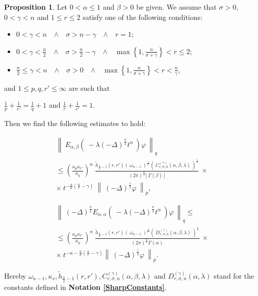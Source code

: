 \documentclass{amsart}
\theoremstyle{definition}
\newtheorem{proposition}[theorem]{Proposition}
\theoremstyle{remark}
\numberwithin{equation}{section}
\begin{document}
\begin{proposition}\label{SobolevYoungProposition}
	Let $0<\alpha\leq 1$ and $\beta>0$ be given.
	We assume that $\sigma>0$, $0<\gamma<n$ and $1\leq r\leq 2$ satisfy one of the following conditions:
	\begin{itemize}
		\item[{\bf (i)}] $0<\gamma< n$~~$\wedge$~~$\sigma>n-\gamma$~~$\wedge$~~$r=1$;
		\item[{\bf (ii)}] $\displaystyle 0<\gamma< \frac{n}{2}$~~$\wedge$~~$\displaystyle \sigma>\frac{n}{2}-\gamma$~~$\wedge$~~$\displaystyle \max\left\{1,\frac{n}{\sigma+\gamma}\right\} <r\leq 2$; 
		\item[{\bf (iii)}] $\displaystyle \frac{n}{2}\leq \gamma< n$~~$\wedge$~~$\sigma>0$~~$\wedge$~~$\displaystyle \max\left\{1,\frac{n}{\sigma+\gamma}\right\} <r<\frac{n}{\gamma}$, 
	\end{itemize}
	and $1\leq p,q,r'\leq \infty$ are such that
	\begin{center}
		$\displaystyle \frac{1}{p}+\frac{1}{r'}=\frac{1}{q}+1$ and $\displaystyle \frac{1}{r}+\frac{1}{r'}=1$.
	\end{center}
	Then we find the following estimates to hold: 
	
	\begin{eqnarray}
		\label{NoSobolevYoungIneqHankel}
		\displaystyle \left\|~ E_{\alpha,\beta}\left(~-\lambda (-\Delta)^{\frac{\sigma}{2}} t^{\alpha}~\right)\varphi~\right\|_q\nonumber \\ \leq \left(\frac{\kappa_p\kappa_{r'}}{\kappa_q}\right)^n~\frac{\widetilde{h}_{\frac{n}{2}-1}(r,r')\left(~\omega_{n-1}~\right)^{\frac{1}{r'}}\left(~C_{r,\sigma,n}^{(\gamma)}(\alpha,\beta,\lambda)~\right)^{\frac{1}{r}}}{(2\pi)^{\frac{n}{2}}\left|~\Gamma(\beta)~\right|}~\times \nonumber  \\ \times ~t^{-\frac{\alpha}{\sigma}\left(\frac{n}{r}-\gamma\right)}~
		\left\|~(-\Delta)^{\frac{\gamma}{2}}\varphi~\right\|_p, \\ \nonumber \\ \nonumber \\
		\displaystyle \left\|~ (-\Delta)^{\frac{\sigma}{2}}E_{\alpha,\alpha}\left(~-\lambda (-\Delta)^{\frac{\sigma}{2}} t^{\alpha}~\right)\varphi~\right\|_q\leq \nonumber \\
		\label{NoSobolevYoungIneqHankel2} \leq \left(\frac{\kappa_p\kappa_{r'}}{\kappa_q}\right)^n~\frac{\widetilde{h}_{\frac{n}{2}-1}(r,r')\left(~\omega_{n-1}~\right)^{\frac{1}{r'}}\left(~D_{r,\sigma,n}^{(\gamma)}(\alpha,\beta,\lambda)~\right)^{\frac{1}{r}}}{(2\pi)^{\frac{n}{2}}\Gamma(\alpha)}~\times \nonumber \\ \times~ t^{-\alpha-\frac{\alpha}{\sigma}\left(\frac{n}{r}-\gamma\right)}
		\left\|~(-\Delta)^{\frac{\gamma}{2}}\varphi~\right\|_p.
	\end{eqnarray}
	\vspace{0.3cm}
	
	Hereby $\omega_{n-1},\kappa_s,\widetilde{h}_{\frac{n}{2}-1}(r,r'),C_{r,\sigma,n}^{(\gamma)}(\alpha,\beta,\lambda)$ and $D_{r,\sigma,n}^{(\gamma)}(\alpha,\lambda)$ stand for the constants defined in {\bf Notation \ref{SharpConstants}}.
\end{proposition}
\end{document}
